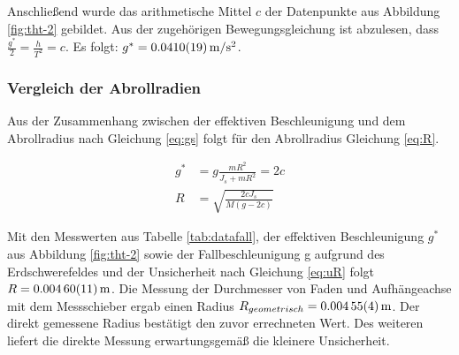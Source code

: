 Anschließend wurde das arithmetische Mittel $c$ der Datenpunkte aus Abbildung \ref{fig:tht-2} gebildet. Aus der zugehörigen Bewegungsgleichung ist abzulesen, dass $\frac{g^*}{2}=\frac{h}{T^2}=c$. Es folgt: $g^*=\SI{0.0410 \pm  0.0019}{m \per s \squared}$.



\FloatBarrier

\subsubsection{Vergleich der Abrollradien}


Aus der Zusammenhang zwischen der effektiven Beschleunigung und  dem Abrollradius nach Gleichung \ref{eq:gs} folgt für den Abrollradius Gleichung \ref{eq:R}.

\begin{align}
g^*  &= g \frac{mR^2}{J_s + m R^2}= 2c \label{eq:gs}\\
R&=\sqrt{\frac{2 c J_s}{M (g-2c)}} \label{eq:R}
\end{align}

Mit den Messwerten aus Tabelle \ref{tab:datafall}, der effektiven Beschleunigung $g^*$ aus Abbildung \ref{fig:tht-2} sowie der Fallbeschleunigung g aufgrund des Erdschwerefeldes und der Unsicherheit nach Gleichung \ref{eq:uR} folgt $R=\SI{0.00460\pm 0.00011}{m}$. Die Messung der Durchmesser von Faden und Aufhängeachse mit dem Messschieber ergab einen Radius $R_{geometrisch}=\SI{0.00455 \pm 0.00004}{m}$. Der direkt gemessene Radius bestätigt den zuvor errechneten Wert. Des weiteren liefert die direkte Messung erwartungsgemäß die kleinere Unsicherheit.  